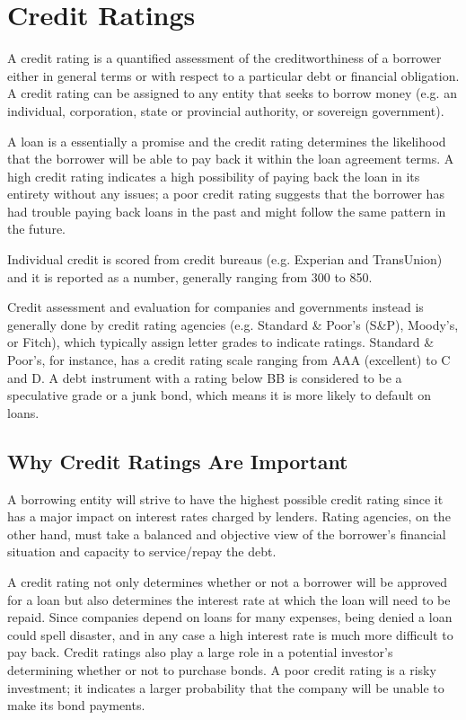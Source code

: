 \section{Credit Ratings}\label{credit-ratings}

A credit rating is a quantified assessment of the creditworthiness of a
borrower either in general terms or with respect to a particular debt or
financial obligation. A credit rating can be assigned to any entity that
seeks to borrow money (e.g. an individual, corporation, state or
provincial authority, or sovereign government).

A loan is a essentially a promise and the credit rating determines the
likelihood that the borrower will be able to pay back it within the loan
agreement terms. A high credit rating indicates a high possibility of
paying back the loan in its entirety without any issues; a poor credit
rating suggests that the borrower has had trouble paying back loans in
the past and might follow the same pattern in the future.

Individual credit is scored from credit bureaus (e.g. Experian and
TransUnion) and it is reported as a number, generally ranging from 300
to 850.

Credit assessment and evaluation for companies and governments instead
is generally done by credit rating agencies (e.g. Standard \& Poor's
(S\&P), Moody's, or Fitch), which typically assign letter grades to
indicate ratings. Standard \& Poor's, for instance, has a credit rating
scale ranging from AAA (excellent) to C and D. A debt instrument with a
rating below BB is considered to be a speculative grade or a junk bond,
which means it is more likely to default on loans.

\subsection{Why Credit Ratings Are Important}\label{why-credit-ratings-are-important}

A borrowing entity will strive to have the highest possible credit
rating since it has a major impact on interest rates charged by lenders.
Rating agencies, on the other hand, must take a balanced and objective
view of the borrower's financial situation and capacity to service/repay
the debt.

A credit rating not only determines whether or not a borrower will be
approved for a loan but also determines the interest rate at which the
loan will need to be repaid. Since companies depend on loans for many
expenses, being denied a loan could spell disaster, and
in any case a high interest rate is much more difficult to pay back.
Credit ratings also play a large role in a potential investor's
determining whether or not to purchase bonds. A poor credit rating is a
risky investment; it indicates a larger probability that the company
will be unable to make its bond payments.

